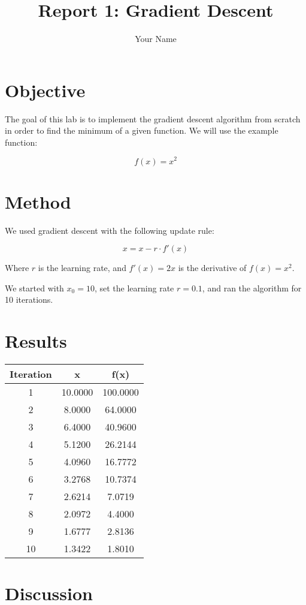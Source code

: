 \documentclass{article}
\title{Report 1: Gradient Descent}
\author{Your Name}
\date{}
\begin{document}
\maketitle

\section*{Objective}
The goal of this lab is to implement the gradient descent algorithm from scratch in order to find the minimum of a given function. We will use the example function:

\[
f(x) = x^2
\]

\section*{Method}
We used gradient descent with the following update rule:

\[
x = x - r \cdot f'(x)
\]

Where \( r \) is the learning rate, and \( f'(x) = 2x \) is the derivative of \( f(x) = x^2 \).

We started with \( x_0 = 10 \), set the learning rate \( r = 0.1 \), and ran the algorithm for 10 iterations.

\section*{Results}

\begin{center}
\begin{tabular}{|c|c|c|}
\hline
Iteration & x & f(x) \\
\hline
1 & 10.0000 & 100.0000 \\
2 & 8.0000 & 64.0000 \\
3 & 6.4000 & 40.9600 \\
4 & 5.1200 & 26.2144 \\
5 & 4.0960 & 16.7772 \\
6 & 3.2768 & 10.7374 \\
7 & 2.6214 & 7.0719 \\
8 & 2.0972 & 4.4000 \\
9 & 1.6777 & 2.8136 \\
10 & 1.3422 & 1.8010 \\
\hline
\end{tabular}
\end{center}

\section*{Discussion}
\end{document}
